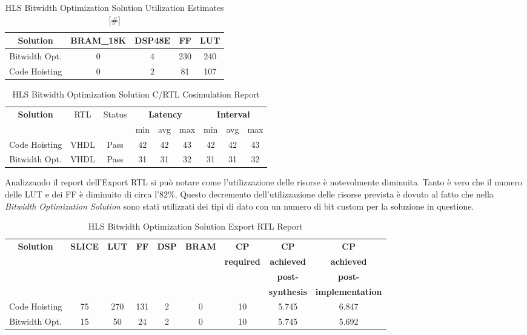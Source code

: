 \begin{table}[H]
	\centering
	\begin{tabular}{|c|c|c|c|c|}
		\hline
		\textbf{Solution} & \textbf{BRAM\_18K} & \textbf{DSP48E} & \textbf{FF} & \textbf{LUT} \\
		\hline
		Bitwidth Opt. & 0 & 4 & 230 & 240 \\
		\hline
		Code Hoisting & 0 & 2 & 81 & 107 \\
		\hline
	\end{tabular}
	\caption{HLS Bitwidth Optimization Solution Utilization Estimates [\#]}
	\label{tab:vivado-bitwidth-optimization-solution-utilization-report}
\end{table}

\begin{table}[H]
	\centering
	\begin{tabular}{|c|c|c|c|c|c|c|c|c|}
		\hline
		\multicolumn{1}{|c|}{\textbf{Solution}} & \multicolumn{1}{|c|}{RTL} & \multicolumn{1}{|c|}{Status} & \multicolumn{3}{c|}{\textbf{Latency}} & \multicolumn{3}{c|}{\textbf{Interval}} \\
		& &  & min & avg & max & min & avg & max \\
		\hline
		Code Hoisting & VHDL & Pass & 42 & 42 & 43 & 42 & 42 & 43 \\
		\hline
		Bitwidth Opt. & VHDL & Pass & 31 & 31 & 32 & 31 & 31 & 32 \\
		\hline
	\end{tabular}
	\caption{HLS Bitwidth Optimization Solution C/RTL Cosimulation Report }
	\label{tab:hls-bitwidth-optimization-solution-cosimulation-report}
\end{table}

Analizzando il report dell'Export RTL si può notare come l'utilizzazione delle risorse è notevolmente diminuita. Tanto è vero che il numero delle LUT e dei FF è diminuito di circa l'$82\%$. Questo decremento dell'utilizzazione delle risorse prevista è dovuto al fatto che nella \textit{Bitwidth Optimization Solution} sono stati utilizzati dei tipi di dato con un numero di bit custom per la soluzione in questione.

\begin{table}[H]
	\centering
	\begin{tabular}{|c|c|c|c|c|c|c|c|c|}
		\hline
		\textbf{Solution} & \textbf{SLICE} & \textbf{LUT} & \textbf{FF} & \textbf{DSP} & \textbf{BRAM} & \textbf{CP} & \textbf{CP} & \textbf{CP} \\
		& & & & & & \textbf{required} & \textbf{achieved} & \textbf{achieved}\\
		& & & & & & & \textbf{post-} & \textbf{post-}\\
		& & & & & & & \textbf{synthesis} & \textbf{implementation}\\
		\hline
		Code Hoisting & 75 & 270 & 131 & 2 & 0 & 10 & 5.745 & 6.847 \\
		\hline
		Bitwidth Opt. & 15 & 50 & 24 & 2 & 0 & 10 & 5.745 & 5.692 \\
		\hline
	\end{tabular}
	\caption{HLS Bitwidth Optimization Solution Export RTL Report}
	\label{tab:vivado-bitwidth-optimization-solution-export-rtl-report}
\end{table}